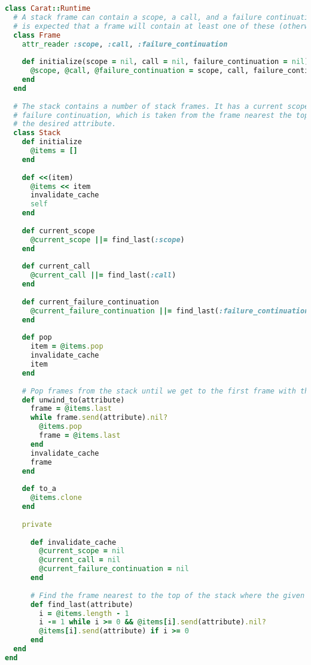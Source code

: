 \begin{lstlisting}[title={\small\Helvetica runtime/stack.rb},language=Ruby]
class Carat::Runtime
  # A stack frame can contain a scope, a call, and a failure continuation. All are optional, but it
  # is expected that a frame will contain at least one of these (otherwise it is pretty useless).
  class Frame
    attr_reader :scope, :call, :failure_continuation
    
    def initialize(scope = nil, call = nil, failure_continuation = nil)
      @scope, @call, @failure_continuation = scope, call, failure_continuation
    end
  end
  
  # The stack contains a number of stack frames. It has a current scope, current call and current
  # failure continuation, which is taken from the frame nearest the top of the stack which has
  # the desired attribute.
  class Stack
    def initialize
      @items = []
    end
    
    def <<(item)
      @items << item
      invalidate_cache
      self
    end
    
    def current_scope
      @current_scope ||= find_last(:scope)
    end
    
    def current_call
      @current_call ||= find_last(:call)
    end
    
    def current_failure_continuation
      @current_failure_continuation ||= find_last(:failure_continuation)
    end
    
    def pop
      item = @items.pop
      invalidate_cache
      item
    end
    
    # Pop frames from the stack until we get to the first frame with the given attribute
    def unwind_to(attribute)
      frame = @items.last
      while frame.send(attribute).nil?
        @items.pop
        frame = @items.last
      end
      invalidate_cache
      frame
    end
    
    def to_a
      @items.clone
    end
    
    private
    
      def invalidate_cache
        @current_scope = nil
        @current_call = nil
        @current_failure_continuation = nil
      end
      
      # Find the frame nearest to the top of the stack where the given attribute is non-nil
      def find_last(attribute)
        i = @items.length - 1
        i -= 1 while i >= 0 && @items[i].send(attribute).nil?
        @items[i].send(attribute) if i >= 0
      end
  end
end

\end{lstlisting}
